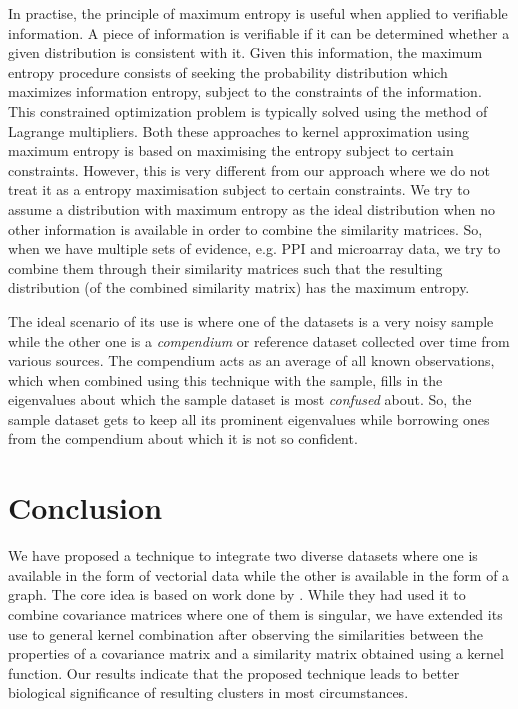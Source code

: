 In practise, the principle of maximum entropy is useful when applied to verifiable information. A piece of information is verifiable if it can 
be determined whether a given distribution is consistent with it. Given this information, the maximum entropy procedure consists 
of seeking the probability distribution which maximizes information entropy, subject to the constraints of the information. This constrained 
optimization problem is typically solved using the method of Lagrange multipliers. Both these approaches to kernel approximation 
\citep{Tsuda2004Learning, fujibuchi2007classification} using maximum entropy is based on maximising the entropy subject to certain 
constraints. However, this is very different from our approach where we do not treat it as a entropy maximisation subject to certain constraints. 
We try to assume a distribution with maximum entropy as the ideal distribution when no other information is available in order to combine the 
similarity matrices. So, when we have multiple sets of evidence, e.g. PPI and microarray data, we try to combine them through their similarity 
matrices such that the resulting distribution (of the combined similarity matrix) has the maximum entropy.

The ideal scenario of its use is where one of the datasets is a very noisy sample while the other one is a \textit{compendium} or 
reference dataset collected over time from various sources. The compendium acts as an average of all known observations, which when 
combined using this technique with the sample, fills in the eigenvalues about which the sample dataset is most \textit{confused} about. 
So, the sample dataset gets to keep all its prominent eigenvalues while borrowing ones from the compendium about which it is not so confident. 


\section{Conclusion}

We have proposed a technique to integrate two diverse datasets where one is available in the form of vectorial data while the 
other is available in the form of a graph. The core idea is based on work done by \citet{thomaz2004covariance}. While they had 
used it to combine covariance matrices where one of them is singular, we have extended its use to general kernel combination after 
observing the similarities between the properties of a covariance matrix and a similarity matrix obtained using a kernel function. Our 
results indicate that the proposed technique leads to better biological significance of resulting clusters in most circumstances.

